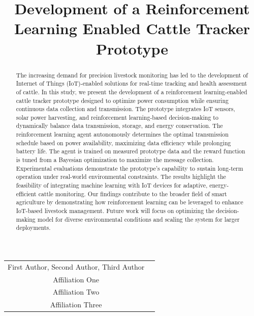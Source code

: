 \documentclass[10pt]{cai}
\begin{document}
\def\conferenceyear{2025}
\begin{center}

\title{Development of a Reinforcement Learning Enabled Cattle Tracker Prototype}
\maketitle

\thispagestyle{empty}

\begin{tabular}{cc}
First Author\upstairs{\affilone,*}, Second Author\upstairs{\affilone}, Third Author\upstairs{\affilthree}
\\[0.25ex]
{\small \upstairs{\affilone} Affiliation One} \\
{\small \upstairs{\affiltwo} Affiliation Two} \\
{\small \upstairs{\affilthree} Affiliation Three} \\
\end{tabular}
  
\vspace*{0.2in}
\end{center}

\begin{abstract}
The increasing demand for precision livestock monitoring has led to the development of Internet of Things (IoT)-enabled solutions for real-time tracking and health assessment of cattle. 
In this study, we present the development of a reinforcement learning-enabled cattle tracker prototype designed to optimize power consumption while ensuring continuous data collection and transmission. 
The prototype integrates IoT sensors, solar power harvesting, and reinforcement learning-based decision-making to dynamically balance data transmission, storage, and energy conservation. 
The reinforcement learning agent autonomously determines the optimal transmission schedule based on power availability, maximizing data efficiency while prolonging battery life. 
The agent is trained on measured prototype data and the reward function is tuned from a Bayesian optimization to maximize the message collection.
Experimental evaluations demonstrate the prototype's capability to sustain long-term operation under real-world environmental constraints. 
The results highlight the feasibility of integrating machine learning with IoT devices for adaptive, energy-efficient cattle monitoring.
Our findings contribute to the broader field of smart agriculture by demonstrating how reinforcement learning can be leveraged to enhance IoT-based livestock management. 
Future work will focus on optimizing the decision-making model for diverse environmental conditions and scaling the system for larger deployments.

\end{abstract}
\end{document}
